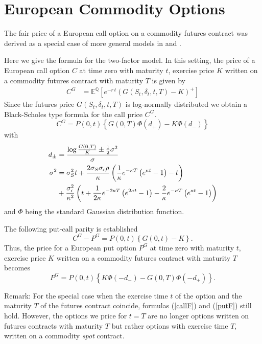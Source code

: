 \documentclass[a4paper,11pt]{article}
\begin{document}
\section{European Commodity Options}
\label{sec:Options}
The fair price of a European call option on a commodity futures
contract was derived as a special case of more general models in
\cite{Miltersen1998} and \cite{Hilliard1998}.

Here we give the formula for the two-factor model. In this setting,
the price of a European call option $C$ at time zero with maturity $t$,
exercise price $K$ written on a commodity futures contract with
maturity $T$ is given by
\begin{align}
  C^G &= \mathbb{E}^{\mathbb{Q}}\left[e^{-r\,t}(G(S_t, \delta_t, t, T)
    - K)^+\right]
\end{align}
Since the futures price $G(S_t, \delta_t, t, T)$ is log-normally
distributed we obtain a Black-Scholes type formula for the call price
$C^G$.
\begin{equation}
  \label{callF}
  C^G = P(0,t) \left\{G(0,T) \Phi(d_+) - K \Phi(d_-)\right\}
\end{equation}
with
\begin{align*}
d_\pm &= \frac{\log\frac{G(0,T)}{K} \pm \frac{1}{2}\sigma^2}{\sigma}\\
\sigma^2 &= \sigma_{S}^2 t + \frac{2 \sigma_{S} \sigma_{\epsilon} \rho}{\kappa}
\left(\frac{1}{\kappa} e^{-\kappa T}
  \left(e^{\kappa t} - 1\right) - t\right)\\
&+ \frac{\sigma_{\epsilon}^2}{\kappa^2}
\left(t + \frac{1}{2 \kappa} e^{-2 \kappa T}
  \left(e^{2 \kappa t} - 1\right) - \frac{2}{\kappa}
  e^{-\kappa T}  \left(e^{\kappa t} - 1\right)\right)\notag
\end{align*}
and $\Phi$ being the standard Gaussian distribution
function.

The following put-call parity is established
\begin{equation}
C^G - P^G = P(0,t)\left\{G(0,t) - K\right\}.
\end{equation}
Thus, the price for a European put option $P^G$ at time zero with
maturity $t$, exercise price $K$ written on a commodity futures
contract with maturity $T$ becomes
\begin{equation}
  \label{putF}
  P^G = P(0,t) \left\{K \Phi(-d_-) - G(0,T) \Phi(-d_+)\right\}.
\end{equation}

Remark: For the special case when the exercise time $t$ of the option
and the maturity $T$ of the futures contract coincide, formulas
(\ref{callF}) and (\ref{putF}) still hold. However, the options we
price for $t=T$ are no longer options written on futures contracts
with maturity $T$ but rather options with exercise time $T$, written on
a commodity \emph{spot} contract.
\end{document}
